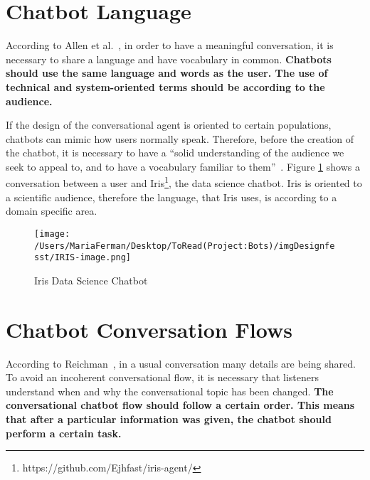\documentclass[a4paper,10pt]{article}
\begin{document}
\section{Chatbot Language}
According to Allen et al.~\cite{allen1978conversation}, in order to have a meaningful conversation, it is necessary to share a language and have vocabulary in common. \textbf{Chatbots should use the same language and words as the user. The use of technical and system-oriented terms should be according to the audience.} 

 If the design of the conversational agent is oriented to certain populations, chatbots can mimic how users normally speak.  Therefore, before the creation of the chatbot, it is necessary to have a ``solid understanding of the audience we seek to appeal to, and to have a vocabulary familiar to them”~\cite{HeuristicsWebPage}. Figure \ref{FigureIRIS} shows a conversation between a user and Iris\footnote{https://github.com/Ejhfast/iris-agent/}, the data science chatbot. Iris is oriented to a scientific audience, therefore the language, that Iris uses, is according to a domain specific area.  

\begin{figure}
\centering
\texttt{[image: /Users/MariaFerman/Desktop/ToRead(Project:Bots)/imgDesignfesst/IRIS-image.png]}
\caption{Iris Data Science Chatbot}
\label{FigureIRIS}
\end{figure}
\section{Chatbot Conversation Flows}
According to Reichman~\cite{reichman1985getting}, in a usual conversation many details are being shared. To avoid an incoherent conversational flow, it is necessary that listeners understand when and why the conversational topic has been changed. \textbf{The conversational chatbot flow should follow a certain order. This means that after a particular information was given, the chatbot should perform a certain task.} 
\end{document}
